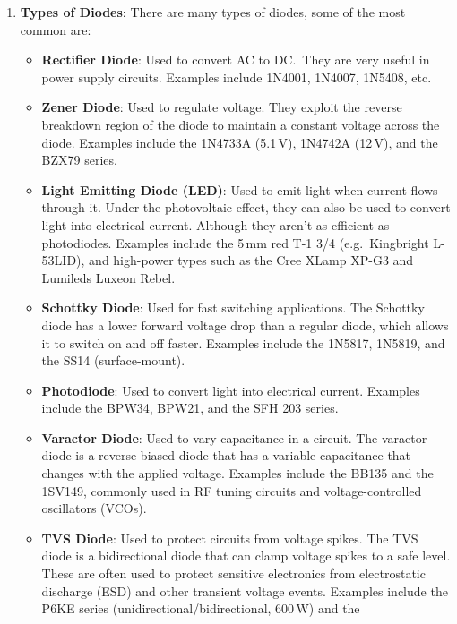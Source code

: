 \begin{enumerate}
  \item \textbf{Types of Diodes}:
    There are many types of diodes, some of the most common are:
    \begin{itemize}
      \item \textbf{Rectifier Diode}: Used to convert AC to DC.\ They
        are very useful in power supply circuits. Examples include 1N4001,
        1N4007, 1N5408, etc.
      \item \textbf{Zener Diode}: Used to regulate voltage. They exploit
        the reverse breakdown region of the diode to maintain a
        constant voltage across the diode. Examples include the
        1N4733A (5.1\,V), 1N4742A (12\,V), and the BZX79 series.
      \item \textbf{Light Emitting Diode (LED)}: Used to emit
        light when current flows through it. Under the photovoltaic
        effect, they can also be used to convert light into electrical
        current. Although they aren't as efficient as photodiodes.
        Examples include the 5\,mm red T-1 3/4 (e.g.\ Kingbright L-53LID),
        and high-power types such as the Cree XLamp XP-G3 and Lumileds
        Luxeon Rebel.
      \item \textbf{Schottky Diode}: Used for fast switching
        applications. The Schottky diode has a lower forward voltage
        drop than a regular diode, which allows it to switch on and
        off faster. Examples include the 1N5817, 1N5819, and the
        SS14 (surface-mount).
      \item \textbf{Photodiode}: Used to convert light into
        electrical current. Examples include the BPW34, BPW21, and
        the SFH 203 series.
      \item \textbf{Varactor Diode}: Used to vary capacitance in
        a circuit. The varactor diode is a reverse-biased diode that
        has a variable capacitance that changes with the applied voltage.
        Examples include the BB135 and the 1SV149, commonly used in
        RF tuning circuits and voltage-controlled oscillators (VCOs).
      \item \textbf{TVS Diode}: Used to protect circuits from voltage
        spikes. The TVS diode is a bidirectional diode that can clamp
        voltage spikes to a safe level. These are often used to protect
        sensitive electronics from electrostatic discharge (ESD) and
        other transient voltage events. Examples include the P6KE
        series (unidirectional/bidirectional, 600\,W) and the

\end{itemize}
\end{enumerate}
